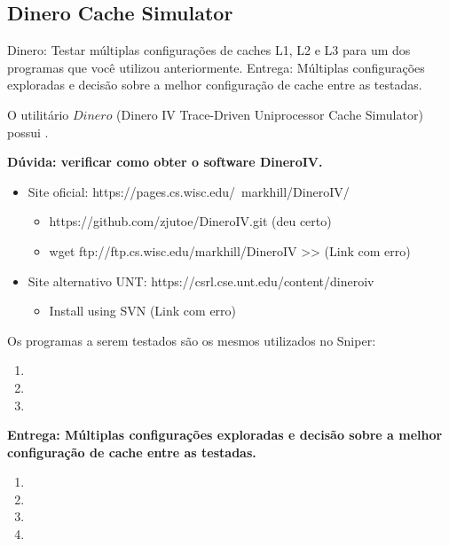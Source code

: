 
\subsection{Dinero Cache Simulator}

Dinero: Testar múltiplas configurações de caches L1, L2 e L3 para um dos programas que você utilizou anteriormente. Entrega: Múltiplas configurações exploradas e decisão sobre a melhor configuração de cache entre as testadas.

O utilitário $Dinero$ (Dinero IV Trace-Driven Uniprocessor Cache Simulator) possui .

\textbf{Dúvida: verificar como obter o software DineroIV.}

\begin{itemize}
    \item Site oficial: https://pages.cs.wisc.edu/~markhill/DineroIV/
    \begin{itemize}
        \item https://github.com/zjutoe/DineroIV.git (deu certo)
        \item wget ftp://ftp.cs.wisc.edu/markhill/DineroIV >> (Link com erro)
    \end{itemize}
    \item Site alternativo UNT: https://csrl.cse.unt.edu/content/dineroiv
    \begin{itemize}
        \item Install using SVN (Link com erro)
    \end{itemize}
\end{itemize}


Os programas a serem testados são os mesmos utilizados no Sniper:

\begin{enumerate}
    \item 
    \item 
    \item 
\end{enumerate}


\textbf{Entrega: Múltiplas configurações exploradas e decisão sobre a melhor configuração de cache entre as testadas.} \\

\begin{enumerate}
    \item  
    \item  
    \item  
    \item  
\end{enumerate}
